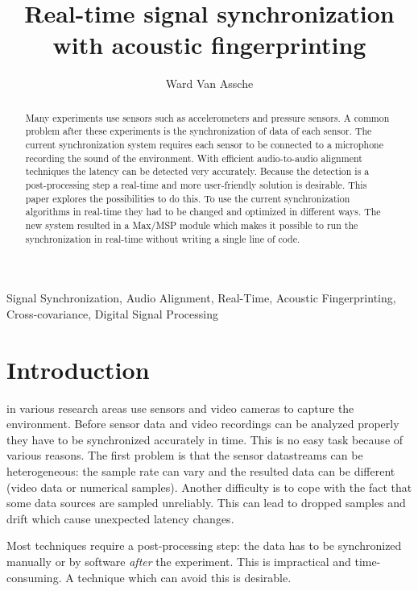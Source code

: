 \documentclass[twocolumn]{phdsymp} %
\begin{document}
\title{Real-time signal synchronization with acoustic fingerprinting} %

\author{Ward Van Assche}


\maketitle

\begin{abstract}
Many experiments use sensors such as accelerometers and pressure sensors. A common problem after these experiments is the synchronization of data of each sensor. The current synchronization system requires each sensor to be connected to a microphone recording the sound of the environment. With efficient audio-to-audio alignment techniques the latency can be detected very accurately. Because the detection is a post-processing step a real-time and more user-friendly solution is desirable. This paper explores the possibilities to do this. To use the current synchronization algorithms in real-time they had to be changed and optimized in different ways. The new system resulted in a Max/MSP module which makes it possible to run the synchronization in real-time without writing a single line of code.
\end{abstract}

\begin{keywords}
Signal Synchronization, Audio Alignment, Real-Time, Acoustic Fingerprinting, Cross-covariance, Digital Signal Processing
\end{keywords}

\section{Introduction}


 in various research areas use sensors and video cameras to capture the environment.  Before sensor data and video recordings can be analyzed properly they have to be synchronized accurately in time. This is no easy task because of various reasons. The first problem is that the sensor datastreams can be heterogeneous: the sample rate can vary and the resulted data can be different (video data or numerical samples). Another difficulty is to cope with the fact that some data sources are sampled unreliably. This can lead to dropped samples and drift which cause unexpected latency changes. 

Most techniques require a post-processing step: the data has to be synchronized manually or by software \emph{after} the experiment. This is impractical and time-consuming. A technique which can avoid this is desirable.
\end{document}
